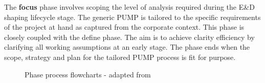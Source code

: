 The \textbf{focus} phase involves scoping the level of analysis required during the E\&D shaping lifecycle stage.
The generic PUMP is tailored to the specific requirements of the project at hand as captured from the corporate context.
This phase is closely coupled with the define phase.
The aim is to achieve clarity efficiency by clarifying all working assumptions at an early stage.
The phase ends when the scope, strategy and plan for the tailored PUMP process is fit for purpose.

\begin{figure}[!h]
  \centering
{} \quad
{}
\caption{Phase process flowcharts - adapted from \cite{chapman}}
\label{Figure:DefineFocus}
\end{figure}

